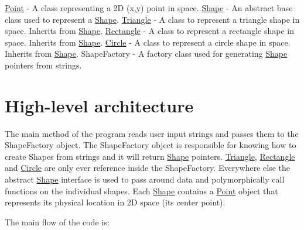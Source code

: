 \hyperlink{class_point}{Point} -\/ A class representing a 2D (x,y) point in space. \hyperlink{class_shape}{Shape} -\/ An abstract base class used to represent a \hyperlink{class_shape}{Shape}. \hyperlink{class_triangle}{Triangle} -\/ A class to represent a triangle shape in space. Inherits from \hyperlink{class_shape}{Shape}. \hyperlink{class_rectangle}{Rectangle} -\/ A class to represent a rectangle shape in space. Inherits from \hyperlink{class_shape}{Shape}. \hyperlink{class_circle}{Circle} -\/ A class to represent a circle shape in space. Inherits from \hyperlink{class_shape}{Shape}. Shape\+Factory -\/ A factory class used for generating \hyperlink{class_shape}{Shape} pointers from strings.\hypertarget{index_arch}{}\section{High-\/level architecture}\label{index_arch}
The main method of the program reads user input strings and passes them to the Shape\+Factory object. The Shape\+Factory object is responsible for knowing how to create Shapes from strings and it will return \hyperlink{class_shape}{Shape} pointers. \hyperlink{class_triangle}{Triangle}, \hyperlink{class_rectangle}{Rectangle} and \hyperlink{class_circle}{Circle} are only ever reference inside the Shape\+Factory. Everywhere else the abstract \hyperlink{class_shape}{Shape} interface is used to pass around data and polymorphically call functions on the individual shapes. Each \hyperlink{class_shape}{Shape} contains a \hyperlink{class_point}{Point} object that represents its physical location in 2D space (its center point).

The main flow of the code is\+:



